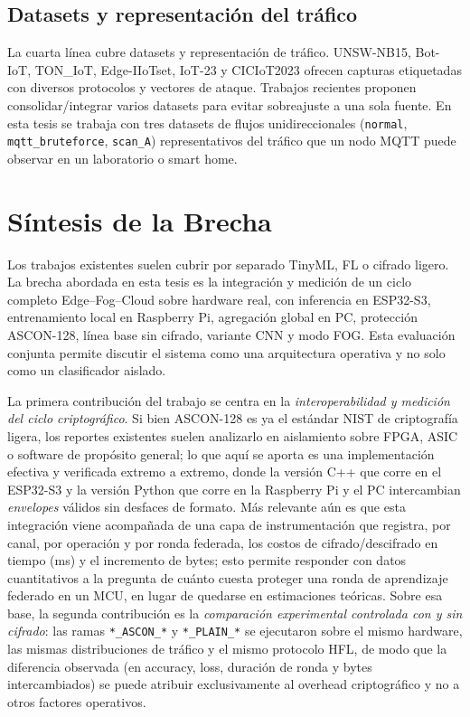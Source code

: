 \subsection{Datasets y representación del tráfico}
La cuarta línea cubre datasets y representación de tráfico. UNSW-NB15, Bot-IoT, TON\_IoT, Edge-IIoTset, IoT-23 y CICIoT2023 \cite{Moustafa2020_TONIoT, UNSW_UNSWNB15_Download, UNSW_BotIoT_Download, UNSW_TONIoT_Download, Ferrag2022_EdgeIIoTset, Stratosphere_IoT23, Neto2023_CICIoT2023} ofrecen capturas etiquetadas con diversos protocolos y vectores de ataque. Trabajos recientes \cite{Rani2024_IoT_IDS_Datasets, Raminenei2023_ML_IoT_UNSWNB15} proponen consolidar/integrar varios datasets para evitar sobreajuste a una sola fuente. En esta tesis se trabaja con tres datasets de flujos unidireccionales (\texttt{normal}, \texttt{mqtt\_bruteforce}, \texttt{scan\_A}) representativos del tráfico que un nodo MQTT puede observar en un laboratorio o smart home.

\section{Síntesis de la Brecha}

Los trabajos existentes suelen cubrir por separado TinyML, FL o cifrado ligero. La brecha abordada en esta tesis es la integración y medición de un ciclo completo Edge--Fog--Cloud sobre hardware real, con inferencia en ESP32-S3, entrenamiento local en Raspberry Pi, agregación global en PC, protección ASCON-128, línea base sin cifrado, variante CNN y modo FOG. Esta evaluación conjunta permite discutir el sistema como una arquitectura operativa y no solo como un clasificador aislado.

La primera contribución del trabajo se centra en la \emph{interoperabilidad y medición del ciclo criptográfico}. Si bien ASCON-128 es ya el estándar NIST de criptografía ligera, los reportes existentes suelen analizarlo en aislamiento sobre FPGA, ASIC o software de propósito general; lo que aquí se aporta es una implementación efectiva y verificada extremo a extremo, donde la versión C++ que corre en el ESP32-S3 y la versión Python que corre en la Raspberry Pi y el PC intercambian \emph{envelopes} válidos sin desfaces de formato. Más relevante aún es que esta integración viene acompañada de una capa de instrumentación que registra, por canal, por operación y por ronda federada, los costos de cifrado/descifrado en tiempo (ms) y el incremento de bytes; esto permite responder con datos cuantitativos a la pregunta de cuánto cuesta proteger una ronda de aprendizaje federado en un MCU, en lugar de quedarse en estimaciones teóricas. Sobre esa base, la segunda contribución es la \emph{comparación experimental controlada con y sin cifrado}: las ramas \texttt{*\_ASCON\_*} y \texttt{*\_PLAIN\_*} se ejecutaron sobre el mismo hardware, las mismas distribuciones de tráfico y el mismo protocolo HFL, de modo que la diferencia observada (en accuracy, loss, duración de ronda y bytes intercambiados) se puede atribuir exclusivamente al overhead criptográfico y no a otros factores operativos.

